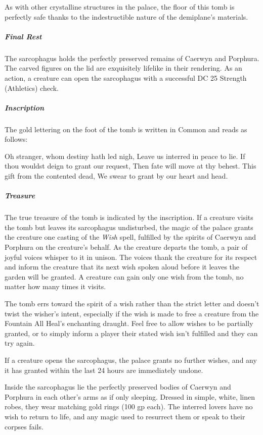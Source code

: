 \documentclass[10pt,a4paper,twoside,bg=print,twocolumn,openany,nodeprecatedcode]{dndbook}
\begin{document}
As with other crystalline structures in the palace, the floor of this tomb is perfectly safe thanks to the indestructible nature of the demiplane's materials.

\subparagraph{Final Rest}
The sarcophagus holds the perfectly preserved remains of Caerwyn and Porphura. The carved figures on the lid are exquisitely lifelike in their rendering. As an action, a creature can open the sarcophagus with a successful DC 25 Strength (Athletics) check.

\subparagraph{Inscription}
The gold lettering on the foot of the tomb is written in Common and reads as follows:

\begin{DndReadAloud}{}
Oh stranger, whom destiny hath led nigh, Leave us interred in peace to lie. If thou wouldst deign to grant our request, Then fate will move at thy behest. This gift from the contented dead, We swear to grant by our heart and head.

\end{DndReadAloud}

\subparagraph{Treasure}
The true treasure of the tomb is indicated by the inscription. If a creature visits the tomb but leaves its sarcophagus undisturbed, the magic of the palace grants the creature one casting of the \textit{Wish} spell, fulfilled by the spirits of Caerwyn and Porphura on the creature's behalf. As the creature departs the tomb, a pair of joyful voices whisper to it in unison. The voices thank the creature for its respect and inform the creature that its next wish spoken aloud before it leaves the garden will be granted. A creature can gain only one wish from the tomb, no matter how many times it visits.

The tomb errs toward the spirit of a wish rather than the strict letter and doesn't twist the wisher's intent, especially if the wish is made to free a creature from the Fountain All Heal's enchanting draught. Feel free to allow wishes to be partially granted, or to simply inform a player their stated wish isn't fulfilled and they can try again.

If a creature opens the sarcophagus, the palace grants no further wishes, and any it has granted within the last 24 hours are immediately undone.

Inside the sarcophagus lie the perfectly preserved bodies of Caerwyn and Porphura in each other's arms as if only sleeping. Dressed in simple, white, linen robes, they wear matching gold rings (100 gp each). The interred lovers have no wish to return to life, and any magic used to resurrect them or speak to their corpses fails.
\end{document}
